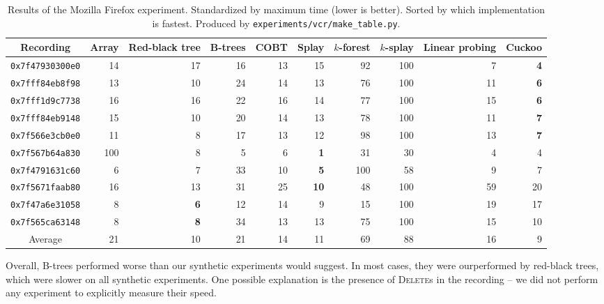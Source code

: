 \begin{table}
\centering
\begin{tabular}{|c|r|r|r|r|r|r|r|r|r|}
	\hline
	Recording &
		Array & Red-black tree &
		B-trees & COBT &
		Splay & $k$-forest & $k$-splay &
		Linear probing & Cuckoo \\
	\hline
	\texttt{0x7f47930300e0} & 14 & 17 & 16 & 13 & 15 & 92 & 100 & 7 & \textbf{4} \\
	\hline
	\texttt{0x7fff84eb8f98} & 13 & 10 & 24 & 14 & 13 & 76 & 100 & 11 & \textbf{6} \\
	\hline
	\texttt{0x7fff1d9c7738} & 16 & 16 & 22 & 16 & 14 & 77 & 100 & 15 & \textbf{6} \\
	\hline
	\texttt{0x7fff84eb9148} & 15 & 10 & 20 & 14 & 13 & 78 & 100 & 11 & \textbf{7} \\
	\hline
	\texttt{0x7f566e3cb0e0} & 11 & 8 & 17 & 13 & 12 & 98 & 100 & 13 & \textbf{7} \\
	\hline
	\texttt{0x7f567b64a830} & 100 & 8 & 5 & 6 & \textbf{1} & 31 & 30 & 4 & 4 \\
	\hline
	\texttt{0x7f4791631c60} & 6 & 7 & 33 & 10 & \textbf{5} & 100 & 58 & 9 & 7 \\
	\hline
	\texttt{0x7f5671faab80} & 16 & 13 & 31 & 25 & \textbf{10} & 48 & 100 & 59 & 20 \\
	\hline
	\texttt{0x7f47a6e31058} & 8 & \textbf{6} & 12 & 14 & 9 & 15 & 100 & 19 & 17 \\
	\hline
	\texttt{0x7f565ca63148} & 8 & \textbf{8} & 34 & 13 & 13 & 75 & 100 & 15 & 10 \\
	\hline
	\hline
	Average & 21 & 10 & 21 & 14 & 11 & 69 & 88 & 16 & 9 \\
	\hline
\end{tabular}
\caption{Results of the Mozilla Firefox experiment. Standardized by maximum
	time (lower is better). Sorted by which implementation is fastest.
	Produced by \texttt{experiments/vcr/make\_table.py}.}
\label{tab:firefox-results}
\end{table}

Overall, \mbox{B-trees} performed worse than our synthetic experiments would
suggest. In most cases, they were ourperformed by red-black trees, which
were slower on all synthetic experiments.
One possible explanation is the presence of \textsc{Delete}s in the recording --
we did not perform any experiment to explicitly measure their speed.

